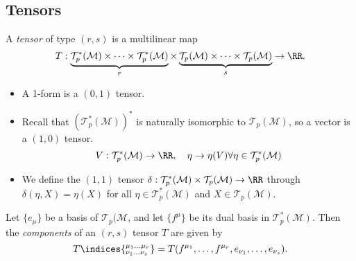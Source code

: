 \documentclass{jknotes}
\begin{document}
\subsection{Tensors}
\begin{defn}
    A \emph{tensor} of type \((r,s)\) is a multilinear map
    \begin{equation}
        T:\underbrace{\mathcal{T}^*_p(\mathcal{M})\times\dots\times\mathcal{T}^*_p(\mathcal{M})}_{r} \times \underbrace{\mathcal{T}_p(\mathcal{M})\times\dots\times\mathcal{T}_p(\mathcal{M})}_s \to \RR.
    \end{equation}
\end{defn}
\begin{eg}
    \begin{itemize}
        \item A 1-form is a \((0,1)\) tensor.
        \item Recall that \((\mathcal{T}_p^*(\mathcal{M}))^*\) is naturally isomorphic to \(\mathcal{T}_p(\mathcal{M})\), so a vector is a \((1,0)\) tensor.
            \begin{equation}
                V:\mathcal{T}_p^*(\mathcal{M})\to\RR,\quad \eta \to \eta(V) \forall \eta \in \mathcal{T}^*_p(\mathcal{M})
            \end{equation}
        \item We define the \((1,1)\) tensor \(\delta:\mathcal{T}^*_p(\mathcal{M})\times\mathcal{T}_p(\mathcal{M})\to\RR\) through \(\delta(\eta,X) = \eta(X)\) for all \(\eta \in \mathcal{T}_p^*(\mathcal{M})\) and \(X \in \mathcal{T}_p(\mathcal{M})\).
    \end{itemize}
\end{eg}

\begin{defn}
    Let \(\{e_\mu\}\) be a basis of \(\mathcal{T}_p(\mathcal{M}\), and let \(\{f^\mu\}\) be its dual basis in \(\mathcal{T}^*_p(\mathcal{M})\). Then the \emph{components} of an \((r,s)\) tensor \(T\) are given by
    \begin{equation}
        T\indices{^{\mu_1\dots\mu_r}_{\nu_1\dots\nu_s}} = T(f^{\mu_1},\dots,f^{\mu_r},e_{\nu_1},\dots,e_{\nu_s}).
    \end{equation}
\end{defn}
\end{document}
